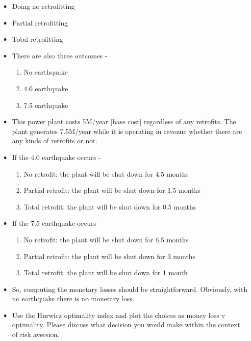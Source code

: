 \documentclass[11pt,a4paper]{article}
\begin{document}
\begin{itemize}
    \item Doing no retrofitting
    \item Partial retrofitting 
    \item Total retrofitting
    \item[] There are also three outcomes - 
        \begin{enumerate}[item-label=(\alph*)]
            \item No earthquake
            \item 4.0 earthquake
            \item 7.5 earthquake
        \end{enumerate}
    \item[] This power plant costs 5M/year [base cost] regardless of any retrofits. The plant generates 7.5M/year while it is operating in revenue whether there are any kinds of retrofits or not.
    \item[] If the 4.0 earthquake occurs - 
        \begin{enumerate}[item-label=(\alph*)]
            \item No retrofit: the plant will be shut down for 4.5 months
            \item Partial retrofit: the plant will be shut down for 1.5 months
            \item Total retrofit: the plant will be shut down for 0.5 months
        \end{enumerate}
    \item[] If the 7.5 earthquake occurs - 
        \begin{enumerate}[item-label=(\alph*)]
            \item No retrofit: the plant will be shut down for 6.5 months
            \item Partial retrofit: the plant will be shut down for 3 months
            \item Total retrofit: the plant will be shut down for 1 month
        \end{enumerate}
    \item[] So, computing the monetary losses should be straightforward. Obviously, with no earthquake there is no monetary loss.
    \item[] Use the Hurwicz optimality index and plot the choices as money loss v optimality. Please discuss what decision you would make within the context of risk aversion.
\end{itemize}
\end{document}
